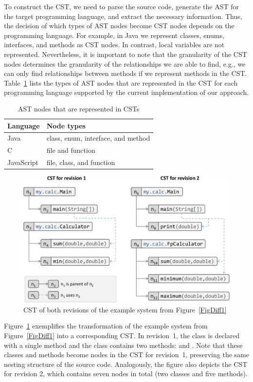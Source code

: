 To construct the CST, we need to parse the source code, generate the AST for the target programming language, and extract the necessary information.
Thus, the decision of which types of AST nodes become CST nodes depends on the programming language.
For example, in Java we represent classes, enums, interfaces, and methods as CST nodes.
In contrast, local variables are not represented.
Nevertheless, it is important to note that the granularity of the CST nodes determines the granularity of the relationships we are able to find, e.g., we can only find relationships between methods if we represent methods in the CST.
Table~\ref{TabCstNodes} lists the types of AST nodes that are represented in the CST for each programming language supported by the current implementation of our approach.

\begin{table}[htbp]
\renewcommand{\arraystretch}{1.2}
\caption{AST nodes that are represented in CSTs}
\label{TabCstNodes}
\centering
\begin{tabular}{@{}ll@{}}
\toprule
Language & Node types \\
\midrule
Java & class, enum, interface, and method \\
C & file and function \\
JavaScript & file, class, and function \\
\bottomrule
\end{tabular}
\end{table}

\begin{figure}[htb]
\centering
\includegraphics[width=0.75\linewidth]{img/cstDiff1.pdf}
\caption{CST of both revisions of the example system from Figure~\ref{FigDiff1}}
\label{FigJavaToCst}
\end{figure}

Figure~\ref{FigJavaToCst} exemplifies the transformation of the example system from Figure~\ref{FigDiff1} into a corresponding CST.
In revision~1, the class  is declared with a single method  and the class  contains two methods:  and .
Note that these classes and methods become nodes in the CST for revision~1, preserving the same nesting structure of the source code. Analogously, the figure also depicts the CST for revision 2, which contains seven nodes in total (two classes and five methods).

